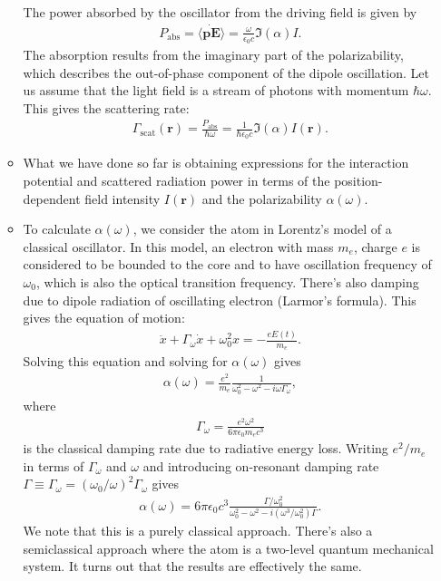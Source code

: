 \documentclass{book}
\theoremstyle{definition}
\begin{document}
\begin{itemize}
\begin{itemize}
		
		The power absorbed by the oscillator from the driving field is given by
		\begin{align}
		P_\text{abs} = \langle \dot{\textbf{p}\textbf{E}}  \rangle = \frac{\omega}{\epsilon_0 c}\Im(\alpha)I.
		\end{align}
		The absorption results from the imaginary part of the polarizability, which describes the out-of-phase component of the dipole oscillation. Let us assume that the light field is a stream of photons with momentum $\hbar \omega$. This gives the scattering rate:
		\begin{align}
		\Gamma_\text{scat}(\textbf{r}) = \frac{P_\text{abs}}{\hbar \omega} = \frac{1}{\hbar \epsilon_0 c}\Im(\alpha) I(\textbf{r}). 
		\end{align}
		
		\item What we have done so far is obtaining expressions for the interaction potential and scattered radiation power in terms of the position-dependent field intensity $I(\textbf{r})$ and the polarizability $\alpha(\omega)$. 
		
		\item To calculate $\alpha(\omega)$, we consider the atom in Lorentz's model of a classical oscillator. In this model, an electron with mass $m_e$, charge $e$ is considered to be bounded to the core and to have oscillation frequency of $\omega_0$, which is also the optical transition frequency. There's also damping due to dipole radiation of oscillating electron (Larmor's formula). This gives the equation of motion:
		\begin{align}
		\ddot{x} + \Gamma_\omega \dot{x} + \omega_0^2 x = -\frac{eE(t)}{m_e}.
		\end{align}
		Solving this equation and solving for $\alpha(\omega)$ gives
		\begin{align}
		\alpha(\omega) = \frac{e^2}{m_e}\frac{1}{\omega_0^2 - \omega^2 -i\omega \Gamma_\omega},
		\end{align}
		where
		\begin{align}
		\Gamma_\omega = \frac{e^2\omega^2}{6\pi \epsilon_0 m_e c^3}
		\end{align}
		is the classical damping rate due to radiative energy loss. Writing $e^2/m_e$ in terms of $\Gamma_\omega$ and $\omega$ and introducing on-resonant damping rate $\Gamma \equiv \Gamma_\omega = (\omega_0/\omega)^2 \Gamma_\omega$ gives
		\begin{align}
		\alpha(\omega) = 6\pi \epsilon_0 c^3 \frac{\Gamma/\omega_0^2}{\omega_0^2 - \omega^2 - i(\omega^3/\omega_0^2)\Gamma}.
		\end{align}
		We note that this is a purely classical approach. There's also a semiclassical approach where the atom is a two-level quantum mechanical system. It turns out that the results are effectively the same. 
		

\end{itemize}
\end{itemize}
\end{document}
